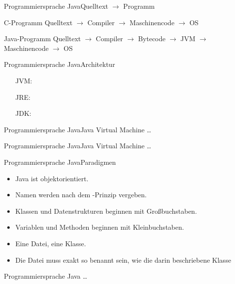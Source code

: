 
\begin{frame}{Programmiersprache Java}{Quelltext $\rightarrow$ Programm}
    \begin{block}{C-Programm}
    Quelltext $\rightarrow$ Compiler $\rightarrow$ Maschinencode $\rightarrow$ OS
    \end{block}
    \begin{block}{Java-Programm}
    Quelltext $\rightarrow$ Compiler $\rightarrow$ Bytecode $\rightarrow$ JVM $\rightarrow$ Maschinencode $\rightarrow$ OS
    \end{block}
\end{frame}

\begin{frame}{Programmiersprache Java}{Architektur}
    \begin{itemize}
        \item[JVM:]
        \item[JRE:]
        \item[JDK:]
    \end{itemize}
\end{frame}

\begin{frame}{Programmiersprache Java}{Java Virtual Machine}
    \ldots
\end{frame}

\begin{frame}{Programmiersprache Java}{Java Virtual Machine}
    \ldots
\end{frame}

\begin{frame}{Programmiersprache Java}{Paradigmen}
    \begin{itemize}
        \item Java ist objektorientiert.
        \item Namen werden nach dem -Prinzip vergeben.
        \item Klassen und Datenstrukturen beginnen mit Großbuchstaben.
        \item Variablen und Methoden beginnen mit Kleinbuchstaben.
        \item Eine Datei, eine Klasse.
        \item Die Datei muss exakt so benannt sein, wie die darin beschriebene Klasse
    \end{itemize}
\end{frame}

\begin{frame}{Programmiersprache Java}{}
    \ldots
\end{frame}
